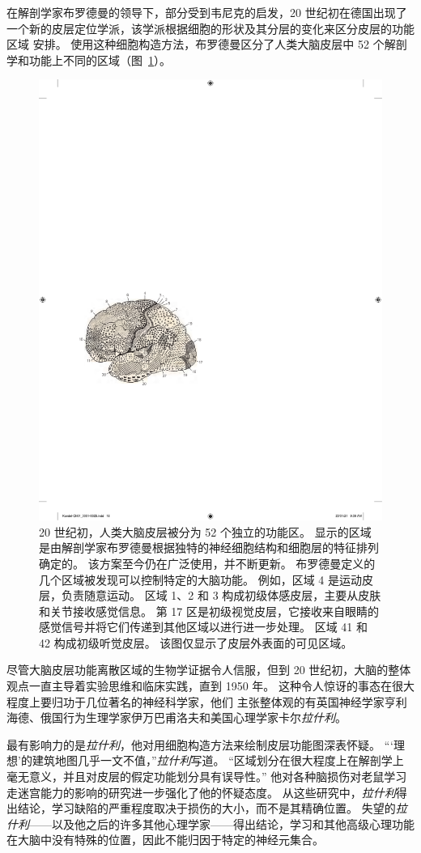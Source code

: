 在解剖学家布罗德曼的领导下，部分受到韦尼克的启发，20 世纪初在德国出现了一个新的皮层定位学派，该学派根据细胞的形状及其分层的变化来区分皮层的功能区域 安排。
使用这种细胞构造方法，布罗德曼区分了人类大脑皮层中 52 个解剖学和功能上不同的区域（图~\ref{fig:1_7}）。


\begin{figure}[htbp]
	\centering
	\includegraphics[width=0.5\linewidth]{chap01/fig_1_7}
	\caption{20 世纪初，人类大脑皮层被分为 52 个独立的功能区。
		显示的区域是由解剖学家布罗德曼根据独特的神经细胞结构和细胞层的特征排列确定的。
		该方案至今仍在广泛使用，并不断更新。
		布罗德曼定义的几个区域被发现可以控制特定的大脑功能。
		例如，区域 4 是运动皮层，负责随意运动。
		区域 1、2 和 3 构成初级体感皮层，主要从皮肤和关节接收感觉信息。
		第 17 区是初级视觉皮层，它接收来自眼睛的感觉信号并将它们传递到其他区域以进行进一步处理。
		区域 41 和 42 构成初级听觉皮层。
		该图仅显示了皮层外表面的可见区域。}
	\label{fig:1_7}
\end{figure}


尽管大脑皮层功能离散区域的生物学证据令人信服，但到 20 世纪初，大脑的整体观点一直主导着实验思维和临床实践，直到 1950 年。
这种令人惊讶的事态在很大程度上要归功于几位著名的神经科学家，他们 主张整体观的有英国神经学家亨利海德、俄国行为生理学家伊万巴甫洛夫和美国心理学家卡尔\textit{拉什利}。


最有影响力的是\textit{拉什利}，他对用细胞构造方法来绘制皮层功能图深表怀疑。
“‘理想’的建筑地图几乎一文不值，”\textit{拉什利}写道。
“区域划分在很大程度上在解剖学上毫无意义，并且对皮层的假定功能划分具有误导性。” 
他对各种脑损伤对老鼠学习走迷宫能力的影响的研究进一步强化了他的怀疑态度。
从这些研究中，\textit{拉什利}得出结论，学习缺陷的严重程度取决于损伤的大小，而不是其精确位置。
失望的\textit{拉什利}——以及他之后的许多其他心理学家——得出结论，学习和其他高级心理功能在大脑中没有特殊的位置，因此不能归因于特定的神经元集合。


